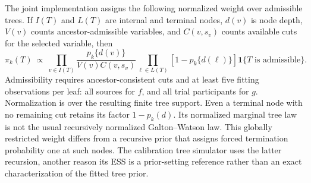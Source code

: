\documentclass[11pt]{article}
\newcommand{\ind}{\mathbf{1}}
\theoremstyle{remark}\newtheorem{remark}{Remark}[section]
\providecommand{\DIFaddtex}[1]{{\protect\color{blue} \sf #1}} %
\providecommand{\DIFaddend}{} %
\providecommand{\DIFadd}[1]{\texorpdfstring{\DIFaddtex{#1}}{#1}} %
\begin{document}
\DIFadd{The joint implementation assigns the following normalized weight over admissible trees. If $I(T)$ and $L(T)$ are internal and terminal nodes, $d(v)$ is node depth, $V(v)$ counts ancestor-admissible variables, and $C(v,s_v)$ counts available cuts for the selected variable, then
}\begin{equation}\label{eq:treeweight}
\pi_k(T)\ \propto\
\prod_{v\in I(T)}\frac{p_k\{d(v)\}}{V(v)C(v,s_v)}
\prod_{\ell\in L(T)}[1-p_k\{d(\ell)\}]
\ind\{T\text{ is admissible}\}.
\end{equation}
\DIFadd{Admissibility requires ancestor-consistent cuts and at least five fitting observations per leaf: all sources for $f$, and all trial participants for $g$. Normalization is over the resulting finite tree support. Even a terminal node with no remaining cut retains its factor $1-p_k(d)$. Its normalized marginal tree law is not the usual recursively normalized Galton--Watson law. This globally restricted weight differs from a recursive prior that assigns forced termination probability one at such nodes. The calibration tree simulator uses the latter recursion, another reason its ESS is a prior-setting reference rather than an exact characterization of the fitted tree prior}\DIFaddend .
\end{document}

